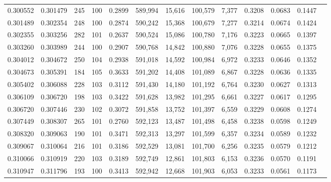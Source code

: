 \begin{tabular}{rrrrrrrrrrrrr}
0.300552 & 0.301479 &   245 & 100 &                                     0.2899 & 589,994 &  15,616 & 100,579 &   7,377 & 0.3208 & 0.0683 & 0.1447 \\
0.301489 & 0.302354 &   248 & 100 &                                     0.2874 & 590,242 &  15,368 & 100,679 &   7,277 & 0.3214 & 0.0674 & 0.1424 \\
0.302355 & 0.303256 &   282 & 101 &                                     0.2637 & 590,524 &  15,086 & 100,780 &   7,176 & 0.3223 & 0.0665 & 0.1397 \\
0.303260 & 0.303989 &   244 & 100 &                                     0.2907 & 590,768 &  14,842 & 100,880 &   7,076 & 0.3228 & 0.0655 & 0.1375 \\
0.304012 & 0.304672 &   250 & 104 &                                     0.2938 & 591,018 &  14,592 & 100,984 &   6,972 & 0.3233 & 0.0646 & 0.1352 \\
0.304673 & 0.305391 &   184 & 105 &                                     0.3633 & 591,202 &  14,408 & 101,089 &   6,867 & 0.3228 & 0.0636 & 0.1335 \\
0.305402 & 0.306088 &   228 & 103 &                                     0.3112 & 591,430 &  14,180 & 101,192 &   6,764 & 0.3230 & 0.0627 & 0.1313 \\
0.306109 & 0.306720 &   198 & 103 &                                     0.3422 & 591,628 &  13,982 & 101,295 &   6,661 & 0.3227 & 0.0617 & 0.1295 \\
0.306720 & 0.307446 &   230 & 102 &                                     0.3072 & 591,858 &  13,752 & 101,397 &   6,559 & 0.3229 & 0.0608 & 0.1274 \\
0.307449 & 0.308307 &   265 & 101 &                                     0.2760 & 592,123 &  13,487 & 101,498 &   6,458 & 0.3238 & 0.0598 & 0.1249 \\
0.308320 & 0.309063 &   190 & 101 &                                     0.3471 & 592,313 &  13,297 & 101,599 &   6,357 & 0.3234 & 0.0589 & 0.1232 \\
0.309067 & 0.310064 &   216 & 101 &                                     0.3186 & 592,529 &  13,081 & 101,700 &   6,256 & 0.3235 & 0.0579 & 0.1212 \\
0.310066 & 0.310919 &   220 & 103 &                                     0.3189 & 592,749 &  12,861 & 101,803 &   6,153 & 0.3236 & 0.0570 & 0.1191 \\
0.310947 & 0.311796 &   193 & 100 &                                     0.3413 & 592,942 &  12,668 & 101,903 &   6,053 & 0.3233 & 0.0561 & 0.1173 \\

\end{tabular}
